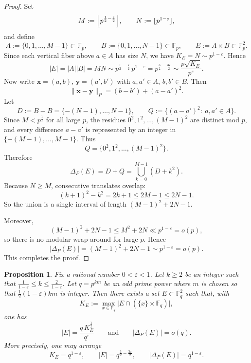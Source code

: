 \documentclass{article}
\newtheorem{proposition}[theorem]{Proposition}
\newcommand{\F}{\mathbb{F}}
\newcommand{\1}{\mathbf{1}}
\begin{document}
\begin{proof}
Set
\[
M:=\Bigl\lfloor p^{\frac12-\frac{\varepsilon}{2}}\Bigr\rfloor,
\qquad
N:=\lfloor p^{1-\varepsilon}\rfloor,
\]
and define
\[
A:=\{0,1,\dots,M-1\}\subset \F_p,
\qquad
B:=\{0,1,\dots,N-1\}\subset \F_p,
\qquad
E:=A\times B\subset \F_p^2.
\]
Since each vertical fiber above \(a\in A\) has size \(N\), we have $K_E=N\sim p^{1-\varepsilon}$.
Hence
\[
|E|=|A| |B|=MN
\sim p^{\frac12-\frac{\varepsilon}{2}}\,p^{1-\varepsilon}
= p^{\frac32-\frac{3\varepsilon}{2}}
\sim \frac{p\sqrt{K_E}}{p^\varepsilon}.
\]
Now write \(\mathbf{x}=(a,b)\), \(\mathbf{y}=(a',b')\) with \(a,a'\in A\), \(b,b'\in B\). Then
\[
\|\mathbf{x}-\mathbf{y}\|_P=(b-b')+(a-a')^2.
\]
Let
\[
D:=B-B=\{-(N-1),\dots,N-1\},
\qquad
Q:=\{(a-a')^2:\ a,a'\in A\}.
\]
Since \(M<p^{\frac{1}{2}}\) for all large \(p\), the residues
$0^2,1^2,\dots,(M-1)^2$
are distinct mod \(p\), and every difference \(a-a'\) is represented by an integer in
\(\{-(M-1),\dots,M-1\}\). Thus
\[
Q=\{0^2,1^2,\dots,(M-1)^2\}.
\]
Therefore
\[
\Delta_P(E)=D+Q=\bigcup_{k=0}^{M-1}(D+k^2).
\]
Because \(N\ge M\), consecutive translates overlap:
\[
(k+1)^2-k^2=2k+1\le 2M-1\le 2N-1.
\]
So the union is a single interval of length
$(M-1)^2+2N-1$.

Moreover,
\[
(M-1)^2+2N-1\le M^2+2N \ll p^{1-\varepsilon}=o(p),
\]
so there is no modular wrap-around for large \(p\). Hence
\[
|\Delta_P(E)|=(M-1)^2+2N-1\sim p^{1-\varepsilon}=o(p).
\]
This completes the proof.
\end{proof}






\begin{proposition}\label{prop:prime-power-exact-sharpness}
Fix a rational number $0 < \varepsilon < 1$. Let $k \ge 2$ be an integer such that $\frac{1}{1-\varepsilon} \le k \le \frac{2}{1-\varepsilon}$. 
Let $q=p^{km}$ be an odd prime power where $m$ is chosen so that %
$\frac{1}{2}(1-\varepsilon)km$ is integer.
Then there exists a set $E\subset \F_q^2$ such that, with
\[
K_E:=\max_{x\in\F_q}\bigl|E\cap (\{x\}\times \F_q)\bigr|,
\]
one has
\[
|E| = \frac{q\,K_E^{\frac{1}{2}}}{q^\varepsilon}
\qquad\text{and}\qquad
|\Delta_P(E)|=o(q).
\]
More precisely, one may arrange
\[
K_E = q^{1-\varepsilon},\qquad
|E| = q^{\frac32-\frac{3\varepsilon}{2}},\qquad
|\Delta_P(E)| = q^{1-\varepsilon}.
\]
\end{proposition}
\end{document}
